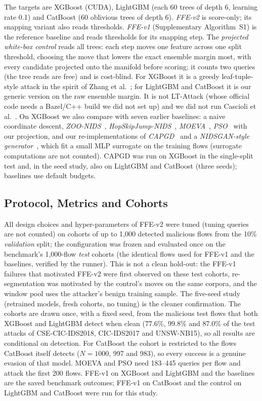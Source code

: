 The targets are XGBoost (CUDA), LightGBM (each 60 trees of depth 6, learning rate 0.1) and CatBoost (60 oblivious trees of depth 6). \emph{FFE-v2} is score-only; its snapping variant also reads thresholds. \emph{FFE-v1} (Supplementary Algorithm~S1) is the reference baseline and reads thresholds for its snapping step. The \emph{projected white-box control} reads all trees: each step moves one feature across one split threshold, choosing the move that lowers the exact ensemble margin most, with every candidate projected onto the manifold before scoring; it counts two queries (the tree reads are free) and is cost-blind. For XGBoost it is a greedy leaf-tuple-style attack in the spirit of Zhang et al.~\cite{zhang2020efficient}; for LightGBM and CatBoost it is our generic version on the raw ensemble margin. It is not LT-Attack (whose official code needs a Bazel/C++ build we did not set up) and we did not run Cascioli et al.~\cite{cascioli2024faster}. On XGBoost we also compare with seven earlier baselines: a naive coordinate descent, \emph{ZOO-NIDS}~\cite{chen2017zoo}, \emph{HopSkipJump-NIDS}~\cite{chen2020hopskipjump}, \emph{MOEVA}~\cite{simonetto2024constrained, ghamizi2020moeva}, \emph{PSO}~\cite{han2021traffic} with our projection, and our re-implementations of \emph{CAPGD}~\cite{simonetto2024constrained} and a \emph{NIDSGAN-style generator}~\cite{zolbayar2022nidsgan}, which fit a small MLP surrogate on the training flows (surrogate computations are not counted). CAPGD was run on XGBoost in the single-split test and, in the seed study, also on LightGBM and CatBoost (three seeds); baselines use default budgets.

\subsection{Protocol, Metrics and Cohorts}
\label{sec:protocol}

All design choices and hyper-parameters of FFE-v2 were tuned (tuning queries are not counted) on cohorts of up to 1,000 detected malicious flows from the 10\% \emph{validation} split; the configuration was frozen and evaluated once on the benchmark's 1,000-flow \emph{test} cohorts (the identical flows used for FFE-v1 and the baselines, verified by the runner). This is not a clean hold-out: the FFE-v1 failures that motivated FFE-v2 were first observed on these test cohorts, re-segmentation was motivated by the control's moves on the same corpora, and the window pool uses the attacker's benign training sample. The five-seed study (retrained models, fresh cohorts, no tuning) is the cleaner confirmation. The cohorts are drawn once, with a fixed seed, from the malicious test flows that both XGBoost and LightGBM detect when clean (77.6\%, 99.8\% and 87.0\% of the test attacks of CSE-CIC-IDS2018, CIC-IDS2017 and UNSW-NB15), so all results are conditional on detection. For CatBoost the cohort is restricted to the flows CatBoost itself detects ($N=1000$, 997 and 983), so every success is a genuine evasion of that model. MOEVA and PSO need 183--445 queries per flow and attack the first 200 flows. FFE-v1 on XGBoost and LightGBM and the baselines are the saved benchmark outcomes; FFE-v1 on CatBoost and the control on LightGBM and CatBoost were run for this study.

